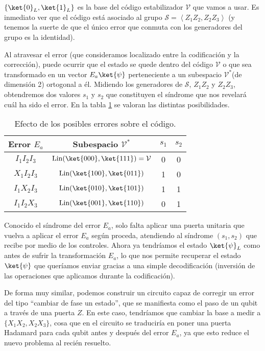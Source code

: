 \documentclass[11pt,a4paper,twoside,pdf]{article}
\numberwithin{equation}{section}
\begin{document}
			$\{\ket{0}_L,\ket{1}_L\}$ es la base del código estabilizador $\mathcal{V}$ que vamos a usar. Es inmediato ver que el código está asociado al grupo $\mathcal{S}=\left\langle Z_1 Z_2 , Z_2 Z_3  \right\rangle $ (y tenemos la suerte de que el único error que conmuta con los generadores del grupo es la identidad).
			
			Al atravesar el error (que consideramos localizado entre la codificación y la corrección), puede ocurrir que el estado se quede dentro del código $\mathcal{V}$ o que sea transformado en un vector $E_a\ket{\psi}$ perteneciente a un subespacio $\mathcal{V}^*$(de dimensión 2) ortogonal a él. Midiendo los generadores de $\mathcal{S}$, $Z_1Z_2$ y $Z_2Z_3$, obtendremos dos valores $s_1$ y $s_2$ que constituyen el síndrome que nos revelará cuál ha sido el error. En la tabla \ref{tab: QEC} se valoran las distintas posibilidades.
			
				\begin{table}[h!]
					\centering
					\begin{tabular}{| c | c | c | c | }
						\hline
						Error $E_a$   & Subespacio $\mathcal{V}^*$    										 & $s_1$ & $s_2$\\ \hline
						$I_1I_2I_3$   & $\text{Lin}(\ket{000},\ket{111})= \mathcal{V}$ & 	0	  &  	0     \\
						$X_1I_2I_3$  & $\text{Lin}(\ket{100},\ket{011})$ 					  & 	1	  & 	 0	   \\
						$I_1X_2I_3$  & $\text{Lin}(\ket{010},\ket{101})$ 					  & 	1      & 	 1 	   \\
						$I_1I_2X_3$  & $\text{Lin}(\ket{001},\ket{110})$ 					  &  	0      &  	 1		\\ \hline
					\end{tabular}
					\caption{Efecto de los posibles errores sobre el código.}
					\label{tab: QEC}
				\end{table}		
			
			Conocido el síndrome del error $E_a$, solo falta aplicar una puerta unitaria que vuelva a aplicar el error $E_a$ según proceda, atendiendo al síndrome $(s_1,s_2)$ que recibe por medio de los controles. Ahora ya tendríamos el estado $\ket{\psi}_L$ como antes de sufrir la transformación $E_a$, lo que nos permite recuperar el estado $\ket{\psi}$ que queríamos enviar gracias a una simple decodificación (inversión de las operaciones que aplicamos durante la codificación).
			
			De forma muy similar, podemos construir un circuito capaz de corregir un error del tipo ``cambiar de fase un estado'', que se manifiesta como el paso de un qubit a través de una puerta $Z$. En este caso, tendríamos que cambiar la base a medir a $\{X_1X_2,X_2X_3\}$, cosa que en el circuito se traduciría en poner una puerta Hadamard para cada qubit antes y después del error $E_a$, ya que esto reduce el nuevo problema al recién resuelto.
			
\end{document}
